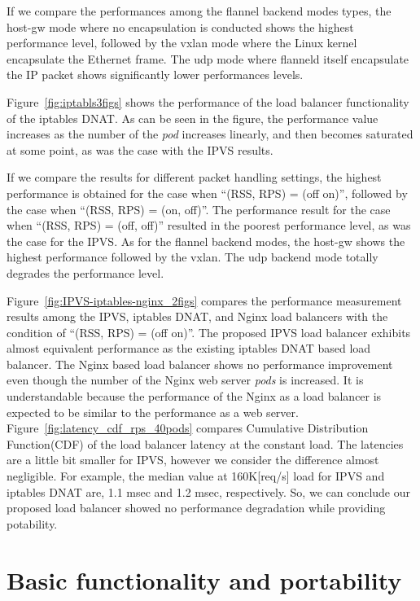 If we compare the performances among the flannel backend modes types, 
the host-gw mode where no encapsulation is conducted shows the highest performance level,
followed by the vxlan mode where the Linux kernel encapsulate the Ethernet frame.
The udp mode where flanneld itself encapsulate the IP packet shows significantly lower performances levels.

Figure~\ref{fig:iptabls3figs} shows the performance of the load balancer 
functionality of the iptables DNAT. 
As can be seen in the figure, the performance value increases as the number of the {\em pod} increases linearly, 
and then becomes saturated at some point, as was the case with the IPVS results.

If we compare the results for different packet handling settings, the highest performance is 
obtained for the case when \enquote{(RSS, RPS) = (off on)}, followed by the case when \enquote{(RSS, RPS) = (on, off)}. 
The performance result for the case when \enquote{(RSS, RPS) = (off, off)} resulted in the 
poorest performance level, as was the case for the IPVS.
As for the flannel backend modes, the host-gw shows the highest performance followed 
by the vxlan. The udp backend mode totally degrades the performance level.

Figure~\ref{fig:IPVS-iptables-nginx_2figs} compares the performance measurement results 
among the IPVS, iptables DNAT, and Nginx load balancers
with the condition of \enquote{(RSS, RPS) = (off on)}.
The proposed IPVS load balancer exhibits almost equivalent performance as the existing iptables DNAT based load balancer. 
The Nginx based load balancer shows no performance improvement even though the number of the Nginx web server {\em pods} is increased.
It is understandable because the performance of the Nginx as a load balancer is expected to be similar to the performance as a web server.
Figure~\ref{fig:latency_cdf_rps_40pods} compares Cumulative Distribution Function(CDF) of the load balancer latency at the constant load.
The latencies are a little bit smaller for IPVS, however we consider the difference almost negligible.
For example, the median value at 160K[req/s] load for IPVS and iptables DNAT are, 1.1 msec and 1.2 msec, respectively.
So, we can conclude our proposed load balancer showed no performance degradation while providing potability.

\section{Basic functionality and portability}


